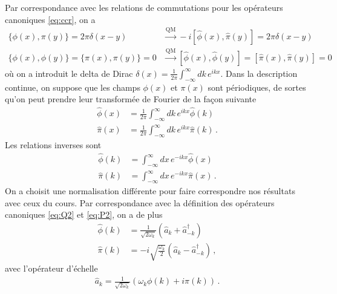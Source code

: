 \documentclass{article}
\numberwithin{equation}{section}
\theoremstyle{solution}
\begin{document}
Par correspondance avec les relations de commutations pour les opérateurs canoniques \eqref{eq:ccr}, on a
\begin{equation}\label{eq:ccr2}
\begin{split}
        \{\phi(x), \pi(y)\} = 2\pi\delta(x - y) &\overset{\mathrm{QM}}{\longrightarrow } -i[\hat{\phi}(x), \hat{\pi}(y)] = 2\pi \delta(x - y)\\
        \{\phi(x), \phi(y)\} = \{\pi(x), \pi(y)\} = 0 &\overset{\mathrm{QM}}{\longrightarrow } [\hat{\phi}(x), \hat{\phi}(y)] = [\hat{\pi}(x), \hat{\pi}(y)] = 0
\end{split}
\end{equation} 
où on a introduit le delta de Dirac $\delta(x) = \frac{1}{2\pi}\int_{-\infty }^{\infty }dk\, e^{ikx}$.
Dans la description continue, on suppose que les champs $\phi(x)$ et $\pi(x)$ sont périodiques, de sortes qu'on 
peut prendre leur transformée de Fourier de la façon suivante
\begin{equation}
\begin{split}
        \hat{ \phi}(x) &= \frac{1}{2\pi} \int_{-\infty }^{\infty} dk\, e^{i kx} \hat{\phi}(k) \\
        \hat{\pi}(x) &= \frac{1}{2\pi}\int_{-\infty }^{\infty } dk\, e^{i kx} \hat{\pi}(k)\, .
\end{split}
\end{equation} 
Les relations inverses sont
\begin{equation}
\begin{split}
        \hat{\phi}(k) &=  \int_{-\infty }^{\infty}dx\,  e^{- i kx} \hat{\phi}(x) \\
        \hat{\pi}(k) &= \int_{-\infty }^{\infty } dx\,e^{- i kx} \hat{\pi}(x)\, .
\end{split}
\end{equation} 
On a choisit une normalisation différente pour faire correspondre nos résultats avec ceux du cours.
Par correspondance avec la définition des opérateurs canoniques \eqref{eq:Q2} et \eqref{eq:P2}, on a de plus
\begin{align}
        \label{eq:Q2c}
        \hat{\phi}(k) &= \frac{1}{\sqrt{2\omega_k}} (\hat{a}_k + \hat{a}^{\dagger}_{-k}) \\[2ex]
        \label{eq:P2c}
        \hat{\pi}(k) &= -i\sqrt{\frac{\omega_k}{2}} (\hat{a}_k - \hat{a}^{\dagger}_{-k})\, ,
\end{align} 
avec l'opérateur d'échelle
\begin{align}
        \hat{a}_k = \frac{1}{\sqrt{2 \omega_k}}(\omega_k \phi(k) + i \pi(k)) \, .
\end{align}
\end{document}
